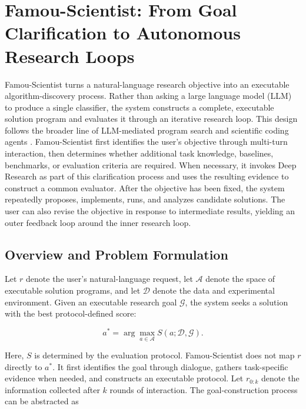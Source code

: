 \section{Famou-Scientist: From Goal Clarification to Autonomous Research Loops}
\label{sec:agent}

Famou-Scientist turns a natural-language research objective into an executable algorithm-discovery process. Rather than asking a large language model (LLM) to produce a single classifier, the system constructs a complete, executable solution program and evaluates it through an iterative research loop. This design follows the broader line of LLM-mediated program search and scientific coding agents \cite{funsearch2023,alphaevolve2025,fmagent2025}. Famou-Scientist first identifies the user's objective through multi-turn interaction, then determines whether additional task knowledge, baselines, benchmarks, or evaluation criteria are required. When necessary, it invokes Deep Research as part of this clarification process and uses the resulting evidence to construct a common evaluator. After the objective has been fixed, the system repeatedly proposes, implements, runs, and analyzes candidate solutions. The user can also revise the objective in response to intermediate results, yielding an outer feedback loop around the inner research loop.

\subsection{Overview and Problem Formulation}
\label{sec:agent_overview}

Let $r$ denote the user's natural-language request, let $\mathcal{A}$ denote the space of executable solution programs, and let $\mathcal{D}$ denote the data and experimental environment. Given an executable research goal $\mathcal{G}$, the system seeks a solution with the best protocol-defined score:

\begin{equation}
\label{eq:solution_objective}
a^{*}=\arg\max_{a\in\mathcal{A}} S(a;\mathcal{D},\mathcal{G}).
\end{equation}

Here, $S$ is determined by the evaluation protocol. Famou-Scientist does not map $r$ directly to $a^{*}$. It first identifies the goal through dialogue, gathers task-specific evidence when needed, and constructs an executable protocol. Let $r_{0:k}$ denote the information collected after $k$ rounds of interaction. The goal-construction process can be abstracted as


